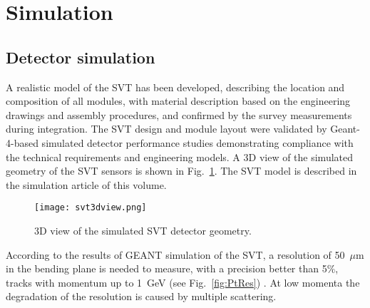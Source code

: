 \section{Simulation}



\subsection{Detector simulation}

A realistic model of the SVT has been developed, describing the location and composition of all modules, with material description based on the engineering drawings and assembly procedures, and confirmed by the survey measurements during integration. The SVT design and module layout were validated by Geant-4-based simulated detector performance studies demonstrating compliance with the technical requirements and engineering models. A 3D view of the simulated geometry of the SVT sensors is shown in Fig.~\ref{fig:svt3dview}. The SVT model is described in the simulation article of this volume. 

\begin{figure}[hbt] 
\centering 
\texttt{[image: svt3dview.png]}
\caption{3D view of the simulated SVT detector geometry.}
\label{fig:svt3dview}
\end{figure}

According to the results of GEANT simulation of the SVT, a resolution of 50~$\mu$m in the bending plane is needed to measure, with a precision better than 5$\%$, tracks with momentum up to 1~GeV (see Fig.~\ref{fig:PtRes}) \cite{MC1,MC2}. At low momenta the degradation of the resolution is caused by multiple scattering.

